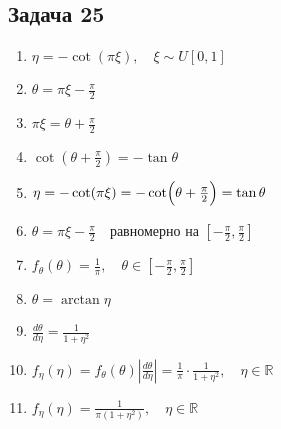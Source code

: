 \documentclass[a4paper,12pt]{article}
\begin{document}
\subsection{Задача 25}
\begin{enumerate}
    \item $\eta = -\cot(\pi \xi), \quad \xi \sim U[0,1]$
    \item $\theta = \pi \xi - \frac{\pi}{2}$
    \item $\pi \xi = \theta + \frac{\pi}{2}$
    \item $\cot\left(\theta+\frac{\pi}{2}\right) = -\tan\theta$
    \item $\eta = -\cot(\pi\xi)= -\cot\Bigl(\theta+\frac{\pi}{2}\Bigr) = \tan\theta$
    \item $\theta = \pi \xi - \frac{\pi}{2} \quad \text{равномерно на } \left[-\frac{\pi}{2},\frac{\pi}{2}\right]$
    \item $f_\theta(\theta) = \frac{1}{\pi}, \quad \theta\in \left[-\frac{\pi}{2},\frac{\pi}{2}\right]$
    \item $\theta = \arctan\eta$
    \item $\frac{d\theta}{d\eta} = \frac{1}{1+\eta^2}$
    \item $f_\eta(\eta) = f_\theta(\theta)\left|\frac{d\theta}{d\eta}\right| = \frac{1}{\pi} \cdot \frac{1}{1+\eta^2}, \quad \eta\in\mathbb{R}$
    \item $\boxed{f_\eta(\eta)=\frac{1}{\pi(1+\eta^2)},\quad \eta\in\mathbb{R}}$
\end{enumerate}
\end{document}
